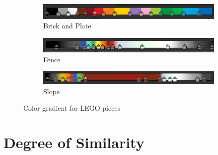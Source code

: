 \documentclass[]{article}
\begin{document}
\begin{figure}[h]
    \centering
    \begin{subfigure}[b]{0.25\textwidth}
        \centering
        \includegraphics[width=\textwidth]{colors/brick-plate-colors.png}
        \caption{Brick and Plate}
    \end{subfigure}\par\medskip
    \begin{subfigure}[b]{0.25\textwidth}
        \centering
        \includegraphics[width=\textwidth]{colors/fence-colors.png}
        \caption{Fence}
    \end{subfigure}\par\medskip
    \begin{subfigure}[b]{0.25\textwidth}
        \centering
        \includegraphics[width=\textwidth]{colors/slope-colors.png}
        \caption{Slope}
    \end{subfigure}\par\medskip
    \caption{Color gradient for LEGO pieces}
\end{figure}

\clearpage

\section{Degree of Similarity}
\end{document}
